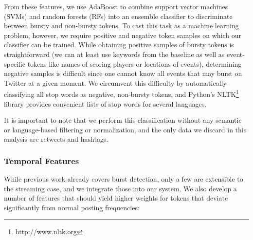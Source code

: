 \documentclass{sig-alternate}
\begin{document}
From these features, we use AdaBoost to combine support vector machines (SVMs) and random forests (RFs) into an ensemble classifier to discriminate between bursty and non-bursty tokens.
To cast this task as a machine learning problem, however, we require positive and negative token samples on which our classifier can be trained.
While obtaining positive samples of bursty tokens is straightforward (we can at least use keywords from the baseline as well as event-specific tokens like names of scoring players or locations of events), determining negative samples is difficult since one cannot know all events that may burst on Twitter at a given moment.
We circumvent this difficulty by automatically classifying all stop words as negative, non-bursty tokens, and Python's NLTK\footnote{http://www.nltk.org} library provides convenient lists of stop words for several languages.

It is important to note that we perform this classification without any semantic or language-based filtering or normalization, and the only data we discard in this analysis are retweets and hashtags.

\subsubsection{Temporal Features}

While previous work already covers burst detection, only a few are extensible to the streaming case, and we integrate those into our system.
We also develop a number of features that should yield higher weights for tokens that deviate significantly from normal posting frequencies:
\end{document}
